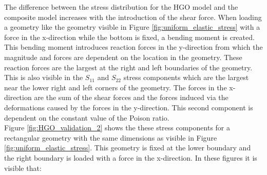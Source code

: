 \qquad The difference between the stress distribution for the HGO model and the composite model increases with the introduction of the shear force. When loading a geometry like the geometry visible in Figure \ref{fig:uniform_elastic_stress} with a force in the x-direction while the bottom is fixed, a bending moment is created. This bending moment introduces reaction forces in the y-direction from which the magnitude and forces are dependent on the location in the geometry. These reaction forces are the largest at the right and left boundaries of the geometry. This is also visible in the $S_{11}$ and $S_{22}$ stress components which are the largest near the lower right and left corners of the geometry. The forces in the x-direction are the sum of the shear forces and the forces induced via the deformations caused by the forces in the y-direction. This second component is dependent on the constant value of the Poison ratio.\\ 


\qquad Figure \ref{fig:HGO_validation_2} shows the these stress components for a rectangular geometry with the same dimensions as visible in Figure \ref{fig:uniform_elastic_stress}. This geometry is fixed at the lower boundary and the right boundary is loaded with a force in the x-direction. In these figures it is visible that:

